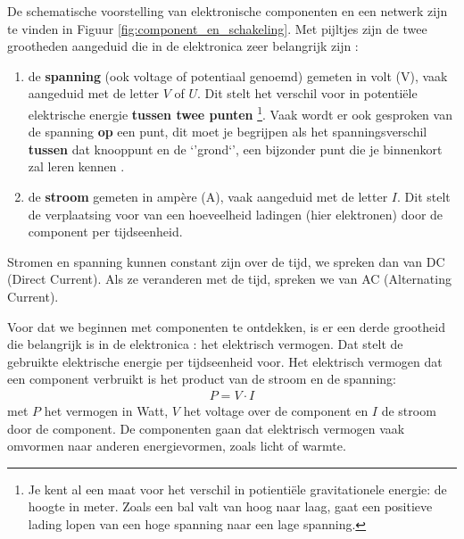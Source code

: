 \documentclass{article}
\begin{document}
		De schematische voorstelling van elektronische componenten en een netwerk zijn te vinden in Figuur \ref{fig:component_en_schakeling}. Met pijltjes zijn de twee grootheden aangeduid die in de elektronica zeer belangrijk zijn :

		\begin{enumerate}
			\item de \textbf{spanning} (ook voltage of potentiaal genoemd) gemeten in volt (V), vaak aangeduid met de letter $V$ of $U$. Dit stelt het verschil voor in potenti\"ele elektrische energie \textbf{tussen twee punten} \footnote{Je kent al een maat voor het verschil in potienti\"ele gravitationele energie: de hoogte in meter. Zoals een bal valt van hoog naar laag, gaat een positieve lading lopen van een hoge spanning naar een lage spanning.}. Vaak wordt er ook gesproken van de spanning \textbf{op} een punt, dit moet je begrijpen als het spanningsverschil \textbf{tussen} dat knooppunt en de `'grond`', een bijzonder punt die je binnenkort  zal leren kennen .%

			\item de \textbf{stroom} gemeten in amp\`ere (A), vaak aangeduid met de letter $I$. Dit stelt de verplaatsing voor van een hoeveelheid ladingen (hier elektronen) door de component per tijdseenheid.
		\end{enumerate}

		Stromen en spanning kunnen constant zijn over de tijd, we spreken dan van DC (Direct Current). Als ze veranderen met de tijd, spreken we van AC (Alternating Current).





		Voor dat we beginnen met componenten te ontdekken, is er een derde grootheid die belangrijk is in de elektronica : het elektrisch vermogen.  Dat stelt de gebruikte elektrische energie per tijdseenheid voor. Het elektrisch vermogen dat een component verbruikt is het product van de stroom en de spanning:
			\begin{align}
			     P = V \cdot I
			     \label{eq:vermogen}
			 \end{align} 
			 met $P$ het vermogen in Watt, $V$ het voltage over de component en $I$ de stroom door de component. De componenten gaan dat elektrisch vermogen vaak omvormen naar anderen energievormen, zoals licht of warmte.
\end{document}

